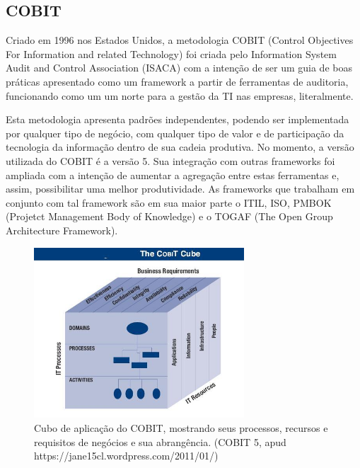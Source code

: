 \subsection{COBIT}

Criado em 1996 nos Estados Unidos, a metodologia COBIT (Control Objectives For Information and related Technology) foi criada pelo Information System Audit and Control Association (ISACA) com a intenção de ser um guia de boas práticas apresentado como um framework a partir de ferramentas de auditoria, funcionando como um um norte para a gestão da TI nas empresas, literalmente.

Esta metodologia apresenta padrões independentes, podendo ser implementada por qualquer tipo de negócio, com qualquer tipo de valor e de participação da tecnologia da informação dentro de sua cadeia produtiva. No momento, a versão utilizada do COBIT é a versão 5. Sua integração com outras frameworks foi ampliada com a intenção de aumentar a agregação entre estas ferramentas e, assim, possibilitar uma melhor produtividade. As frameworks que trabalham em conjunto com tal framework são em sua maior parte o ITIL, ISO, PMBOK (Projetct Management Body of Knowledge) e o TOGAF (The Open Group Architecture Framework).\cite{COBIT-4.1} \cite{SOX-COBIT}
	


        \begin{figure}
            \begin{center}
                \includegraphics[width=0.7\textwidth]{Img2}
            \end{center}
            \caption{Cubo de aplicação do COBIT, mostrando seus processos, recursos e requisitos de negócios e sua abrangência. (COBIT 5, apud https://jane15cl.wordpress.com/2011/01/)}
            \label{fig:Img2}
        \end{figure}



